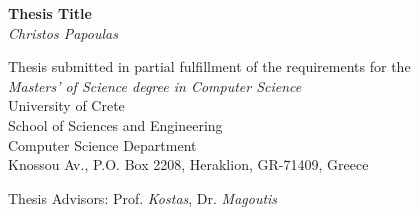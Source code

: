 \begin{titlepage}
\begin{center}

\LARGE \textbf{Thesis Title}\\[0.5cm]
\LARGE \textit{Christos Papoulas}\\[0.5cm]

\vfill

\normalsize{
Thesis submitted in partial fulfillment of the requirements for the\\[0.30cm]

\textit{Masters' of Science degree in Computer Science}}\\[0.30cm]

University of Crete\\
School of Sciences and Engineering\\
Computer Science Department\\
Knossou Av., P.O. Box 2208, Heraklion, GR-71409, Greece\\[0.5cm]

\vfill

\Large{Thesis Advisors: Prof. \emph{Kostas}, Dr. \emph{Magoutis}}\\[0.5cm]

\vfill

\end{center}

\worksupportedby{}
\end{titlepage}
